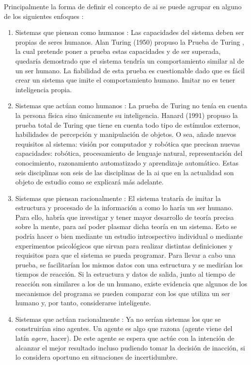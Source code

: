 Principalmente la forma de definir el concepto de \acrshort{ai} se puede agrupar en alguno de los siguientes enfoques \cite{amodernapproach}:
\begin{enumerate}
\item Sistemas que piensan como humanos \cite{haugeland, bellman}: Las capacidades del sistema deben ser propias de seres humanos. Alan Turing (1950) propuso la Prueba de Turing \cite{turing}, la cual pretende poner a prueba estas capacidades y de ser superada, quedaría demostrado que el sistema tendría un comportamiento similar al de un ser humano. La fiabilidad de esta prueba es cuestionable dado que es fácil crear un sistema que imite el comportamiento humano. Imitar no es tener inteligencia propia. \cite{amodernapproach}
\item Sistemas que actúan como humanos \cite{kurzweil, knight}: La prueba de Turing no tenía en cuenta la persona física sino únicamente su inteligencia. Hanard (1991) propuso la prueba total de Turing\cite{harnad} que tiene en cuenta todo tipo de estímulos externos, habilidades de percepción y manipulación de objetos. O sea, añade nuevos requisitos al sistema: visión por computador y robótica que precisan nuevas capacidades: robótica, procesamiento de lenguaje natural, representación del conocimiento, razonamiento automatizado y aprendizaje automático. Estas seis disciplinas son seis de las disciplinas de la \acrshort{ai} que en la actualidad son objeto de estudio como se explicará más adelante. \cite{amodernapproach}
\item Sistemas que piensan racionalmente \cite{charniak, winston}: El sistema trataría de imitar la estructura y procesado de la información a como lo haría un ser humano. Para ello, habría que investigar y tener mayor desarrollo de teoría precisa sobre la mente, para así poder plasmar dicha teoría en un sistema. Esto se podría hacer o bien mediante un estudio introspectivo individual o mediante experimentos psicológicos que sirvan para realizar distintas definiciones y requisitos para que el sistema se pueda programar. Para llevar a cabo una prueba, se facilitarían los mismos datos con una estructura y se medirían los tiempos de reacción. Si la estructura y datos de salida, junto al tiempo de reacción son similares a los de un humano, existe evidencia que algunos de los mecanismos del programa se pueden comparar con los que utiliza un ser humano y, por tanto, considerarse inteligente. \cite{amodernapproach}  
\item Sistemas que actúan racionalmente \cite{poole, nilsson}: Ya no serían sistemas los que se construirían sino agentes. Un agente es algo que razona (agente viene del latín \textit{agere}, hacer). De este agente se espera que actúe con la intención de alcanzar el mejor resultado incluso pudiendo tomar la decisión de inacción, si lo considera oportuno en situaciones de incertidumbre. 
\newline


\end{enumerate}
